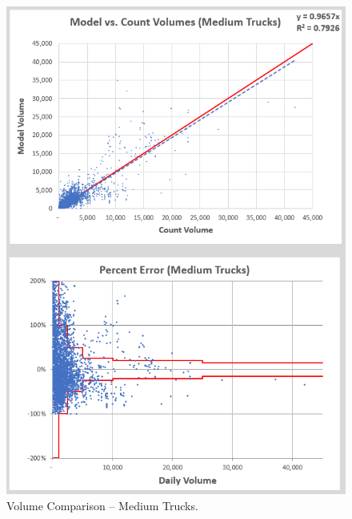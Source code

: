 \documentclass[
  letterpaper,
  DIV=11,
  numbers=noendperiod]{scrreprt}
\begin{document}
\begin{figure}[H]

{\centering \includegraphics[width=\textwidth,height=0.6\textheight]{v9x/v900/validation/_pictures/7-plot4.png}

}

\caption{\label{fig-md-trucks}Volume Comparison -- Medium Trucks.}

\end{figure}
\end{document}
